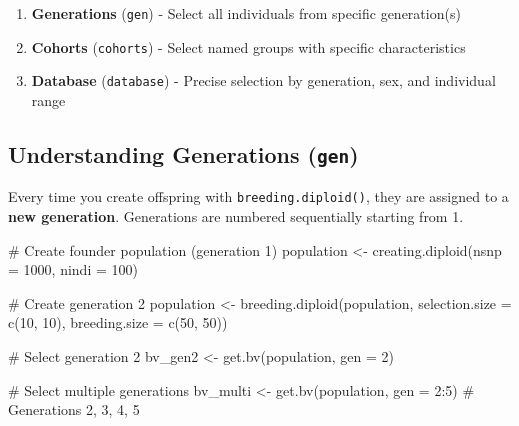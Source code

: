 \documentclass[
  letterpaper,
]{book}
\newenvironment{Shaded}{\begin{snugshade}}{\end{snugshade}}
\newcommand{\AttributeTok}[1]{\textcolor[rgb]{0.40,0.45,0.13}{#1}}
\newcommand{\CommentTok}[1]{\textcolor[rgb]{0.37,0.37,0.37}{#1}}
\newcommand{\DecValTok}[1]{\textcolor[rgb]{0.68,0.00,0.00}{#1}}
\newcommand{\FunctionTok}[1]{\textcolor[rgb]{0.28,0.35,0.67}{#1}}
\newcommand{\NormalTok}[1]{\textcolor[rgb]{0.00,0.23,0.31}{#1}}
\newcommand{\OtherTok}[1]{\textcolor[rgb]{0.00,0.23,0.31}{#1}}
\newcommand{\SpecialCharTok}[1]{\textcolor[rgb]{0.37,0.37,0.37}{#1}}
\providecommand{\tightlist}{%
  \setlength{\itemsep}{0pt}\setlength{\parskip}{0pt}}
\begin{document}
\begin{enumerate}
\def\labelenumi{\arabic{enumi}.}
\tightlist
\item
  \textbf{Generations} (\texttt{gen}) - Select all individuals from
  specific generation(s)
\item
  \textbf{Cohorts} (\texttt{cohorts}) - Select named groups with
  specific characteristics
\item
  \textbf{Database} (\texttt{database}) - Precise selection by
  generation, sex, and individual range
\end{enumerate}

\subsection{\texorpdfstring{Understanding Generations
(\texttt{gen})}{Understanding Generations (gen)}}\label{understanding-generations-gen}

Every time you create offspring with \texttt{breeding.diploid()}, they
are assigned to a \textbf{new generation}. Generations are numbered
sequentially starting from 1.

\begin{Shaded}
\begin{Highlighting}[]
\CommentTok{\# Create founder population (generation 1)}
\NormalTok{population }\OtherTok{\textless{}{-}} \FunctionTok{creating.diploid}\NormalTok{(}\AttributeTok{nsnp =} \DecValTok{1000}\NormalTok{, }\AttributeTok{nindi =} \DecValTok{100}\NormalTok{)}

\CommentTok{\# Create generation 2}
\NormalTok{population }\OtherTok{\textless{}{-}} \FunctionTok{breeding.diploid}\NormalTok{(population,}
                               \AttributeTok{selection.size =} \FunctionTok{c}\NormalTok{(}\DecValTok{10}\NormalTok{, }\DecValTok{10}\NormalTok{),}
                               \AttributeTok{breeding.size =} \FunctionTok{c}\NormalTok{(}\DecValTok{50}\NormalTok{, }\DecValTok{50}\NormalTok{))}

\CommentTok{\# Select generation 2}
\NormalTok{bv\_gen2 }\OtherTok{\textless{}{-}} \FunctionTok{get.bv}\NormalTok{(population, }\AttributeTok{gen =} \DecValTok{2}\NormalTok{)}

\CommentTok{\# Select multiple generations}
\NormalTok{bv\_multi }\OtherTok{\textless{}{-}} \FunctionTok{get.bv}\NormalTok{(population, }\AttributeTok{gen =} \DecValTok{2}\SpecialCharTok{:}\DecValTok{5}\NormalTok{)  }\CommentTok{\# Generations 2, 3, 4, 5}
\end{Highlighting}
\end{Shaded}
\end{document}
